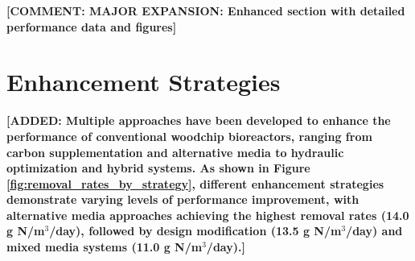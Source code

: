 \documentclass[12pt,a4paper]{article}
\newcommand{\added}[1]{\textcolor{addedtext}{\textbf{[ADDED: #1]}}}
\newcommand{\comment}[1]{\textcolor{commenttext}{\textbf{[COMMENT: #1]}}}
\begin{document}
\comment{MAJOR EXPANSION: Enhanced section with detailed performance data and figures}

\section{Enhancement Strategies}

\added{Multiple approaches have been developed to enhance the performance of conventional woodchip bioreactors, ranging from carbon supplementation and alternative media to hydraulic optimization and hybrid systems. As shown in Figure \ref{fig:removal_rates_by_strategy}, different enhancement strategies demonstrate varying levels of performance improvement, with alternative media approaches achieving the highest removal rates (14.0 g N/m$^3$/day), followed by design modification (13.5 g N/m$^3$/day) and mixed media systems (11.0 g N/m$^3$/day).}
\end{document}
